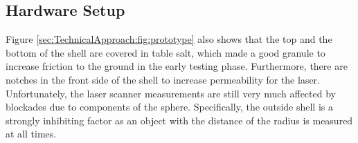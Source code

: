 \subsection{Hardware Setup}
\label{sec:TechnicalApproach:HardwareSetup}

Figure \ref{sec:TechnicalApproach:fig:prototype} also shows that the top and the bottom of the shell are covered in table salt, which made a good granule to increase friction to the ground in the early testing phase. Furthermore, there are notches in the front side of the shell to increase permeability for the laser. Unfortunately, the laser scanner measurements are still very much affected by blockades due to components of the sphere. Specifically, the outside shell is a strongly inhibiting factor as an object with the distance of the radius is measured at all times.
                                                                                                                                                                                                                  
